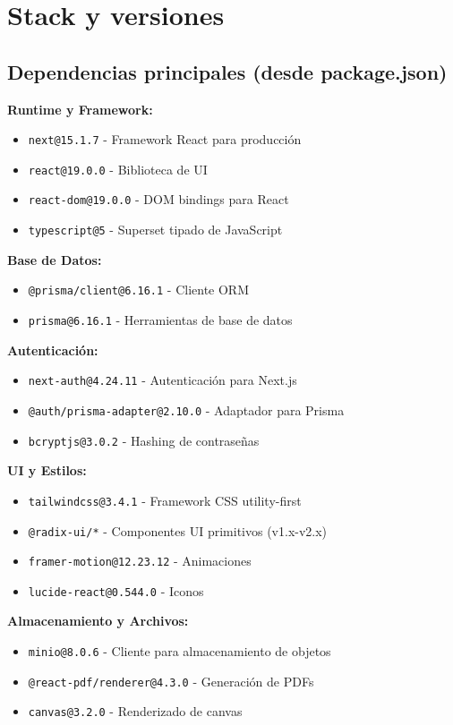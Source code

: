 \documentclass[12pt,a4paper]{article}
\begin{document}
\section{Stack y versiones}

\subsection{Dependencias principales (desde package.json)}

\textbf{Runtime y Framework:}
\begin{itemize}
    \item \texttt{next@15.1.7} - Framework React para producción
    \item \texttt{react@19.0.0} - Biblioteca de UI
    \item \texttt{react-dom@19.0.0} - DOM bindings para React
    \item \texttt{typescript@5} - Superset tipado de JavaScript
\end{itemize}

\textbf{Base de Datos:}
\begin{itemize}
    \item \texttt{@prisma/client@6.16.1} - Cliente ORM
    \item \texttt{prisma@6.16.1} - Herramientas de base de datos
\end{itemize}

\textbf{Autenticación:}
\begin{itemize}
    \item \texttt{next-auth@4.24.11} - Autenticación para Next.js
    \item \texttt{@auth/prisma-adapter@2.10.0} - Adaptador para Prisma
    \item \texttt{bcryptjs@3.0.2} - Hashing de contraseñas
\end{itemize}

\textbf{UI y Estilos:}
\begin{itemize}
    \item \texttt{tailwindcss@3.4.1} - Framework CSS utility-first
    \item \texttt{@radix-ui/*} - Componentes UI primitivos (v1.x-v2.x)
    \item \texttt{framer-motion@12.23.12} - Animaciones
    \item \texttt{lucide-react@0.544.0} - Iconos
\end{itemize}

\textbf{Almacenamiento y Archivos:}
\begin{itemize}
    \item \texttt{minio@8.0.6} - Cliente para almacenamiento de objetos
    \item \texttt{@react-pdf/renderer@4.3.0} - Generación de PDFs
    \item \texttt{canvas@3.2.0} - Renderizado de canvas
\end{itemize}
\end{document}
